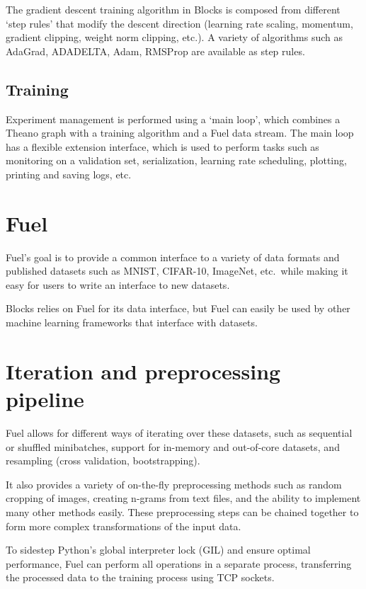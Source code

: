 \documentclass[twoside,11pt]{article}
\begin{document}
The gradient descent training algorithm in Blocks is composed from different
`step rules' that modify the descent direction (learning rate scaling,
momentum, gradient clipping, weight norm clipping, etc.). A variety of
algorithms such as AdaGrad, ADADELTA, Adam, RMSProp are available as step
rules.

\subsection{Training}

Experiment management is performed using a `main loop', which combines a Theano
graph with a training algorithm and a Fuel data stream. The main loop has a
flexible extension interface, which is used to perform tasks such as monitoring
on a validation set, serialization, learning rate scheduling, plotting, printing
and saving logs, etc.

\section{Fuel}

Fuel's goal is to provide a common interface to a variety of data formats and
published datasets such as MNIST, CIFAR-10, ImageNet, etc.\ while making it easy
for users to write an interface to new datasets.

Blocks relies on Fuel for its data interface, but Fuel can easily be used by
other machine learning frameworks that interface with datasets.

\section{Iteration and preprocessing pipeline}

Fuel allows for different ways of iterating over these datasets, such as
sequential or shuffled minibatches, support for in-memory and out-of-core
datasets, and resampling (cross validation, bootstrapping).

It also provides a variety of on-the-fly preprocessing methods such as random
cropping of images, creating n-grams from text files, and the ability to
implement many other methods easily. These preprocessing steps can be
chained together to form more complex transformations of the input data.

To sidestep Python's global interpreter lock (GIL) and ensure optimal
performance, Fuel can perform all operations in a separate process,
transferring the processed data to the training process using TCP sockets.
\end{document}
